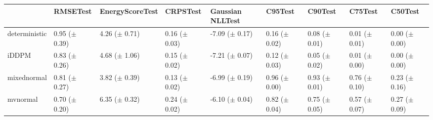 \begin{tabular}{lllllllll}
\toprule
 & RMSETest & EnergyScoreTest & CRPSTest & Gaussian NLLTest & C95Test & C90Test & C75Test & C50Test \\
\midrule
deterministic & \makecell{0.95 \\ ($\pm$ 0.39)} & \makecell{4.26 \\ ($\pm$ 0.71)} & \makecell{0.16 \\ ($\pm$ 0.03)} & \makecell{-7.09 \\ ($\pm$ 0.17)} & \makecell{0.16 \\ ($\pm$ 0.02)} & \makecell{0.08 \\ ($\pm$ 0.01)} & \makecell{0.01 \\ ($\pm$ 0.01)} & \makecell{0.00 \\ ($\pm$ 0.00)} \\
iDDPM & \makecell{0.83 \\ ($\pm$ 0.26)} & \makecell{4.68 \\ ($\pm$ 1.06)} & \makecell{0.15 \\ ($\pm$ 0.02)} & \makecell{-7.21 \\ ($\pm$ 0.07)} & \makecell{0.12 \\ ($\pm$ 0.03)} & \makecell{0.05 \\ ($\pm$ 0.02)} & \makecell{0.01 \\ ($\pm$ 0.00)} & \makecell{0.00 \\ ($\pm$ 0.00)} \\
mixednormal & \makecell{0.81 \\ ($\pm$ 0.27)} & \makecell{3.82 \\ ($\pm$ 0.39)} & \makecell{0.13 \\ ($\pm$ 0.02)} & \makecell{-6.99 \\ ($\pm$ 0.19)} & \makecell{0.96 \\ ($\pm$ 0.00)} & \makecell{0.93 \\ ($\pm$ 0.01)} & \makecell{0.76 \\ ($\pm$ 0.10)} & \makecell{0.23 \\ ($\pm$ 0.16)} \\
mvnormal & \makecell{0.70 \\ ($\pm$ 0.20)} & \makecell{6.35 \\ ($\pm$ 0.32)} & \makecell{0.24 \\ ($\pm$ 0.02)} & \makecell{-6.10 \\ ($\pm$ 0.04)} & \makecell{0.82 \\ ($\pm$ 0.04)} & \makecell{0.75 \\ ($\pm$ 0.05)} & \makecell{0.57 \\ ($\pm$ 0.07)} & \makecell{0.27 \\ ($\pm$ 0.09)} \\

\end{tabular}
